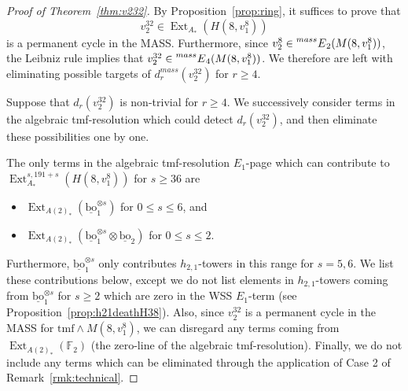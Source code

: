 \documentclass[10pt]{amsart}
\newcommand{\ul}[1]{\underline{#1}}
\newcommand{\FF}{\mathbb{F}}
\newcommand{\tmf}{\mathrm{tmf}}
\newcommand{\bo}{\mathrm{bo}}
\newcommand{\bou}{\ul{\bo}}
\theoremstyle{definition}
\numberwithin{equation}{section}
\numberwithin{figure}{section}
\DeclareMathOperator{\Ext}{Ext}
\newcommand{\E}[2]{\prescript{#1}{#2}{E}}
\begin{document}
\begin{proof}[Proof of Theorem~\ref{thm:v232}]
By Proposition~\ref{prop:ring}, it suffices to prove that
$$ v_2^{32} \in \Ext_{A_*}(H(8,v_1^8)) $$
is a permanent cycle in the MASS.  Furthermore, since $v_2^8 \in \E{mass}{}_2(M(8,v_1^8))$, the Leibniz rule implies that $v_2^{32} \in \E{mass}{}_4(M(8,v_1^8))$.  We therefore are left with eliminating possible targets of $d^{mass}_r(v_2^{32})$ for $r \ge 4$.

Suppose that $d_r(v_2^{32})$ is non-trivial for $r \ge 4$.  We successively consider terms in the algebraic tmf-resolution which could detect $d_r(v_2^{32})$, and then eliminate these possibilities one by one.

The only terms in the algebraic tmf-resolution $E_1$-page which can contribute to $\Ext^{s,191+s}_{A_*}(H(8,v_1^8))$ for $s \ge 36$ are 
\begin{itemize}
\item $\Ext_{A(2)_*}(\bou^{\otimes s}_1)$ for $0 \le s \le 6$, and 
\item $\Ext_{A(2)_*}(\bou^{\otimes s}_1 \otimes \bou_2)$ for $0 \le s \le 2$.
\end{itemize}  
Furthermore, $\bou_1^{\otimes s}$ only contributes $h_{2,1}$-towers in this range for $s = 5,6$.
We list these contributions below, except we   
do not list elements in $h_{2,1}$-towers coming from $\bou_1^{\otimes s}$ for $s \ge 2$ which are zero in the WSS $E_1$-term (see Proposition~\ref{prop:h21deathH38}).  Also, since $v_2^{32}$ is a permanent cycle in the MASS for $\tmf \wedge M(8,v_1^8)$, we can disregard any terms coming from $\Ext_{A(2)_*}(\FF_2)$ (the zero-line of the algebraic tmf-resolution).  Finally, we do not include any terms which can be eliminated through the application of Case 2 of Remark~\ref{rmk:technical}.


\end{proof}
\end{document}
